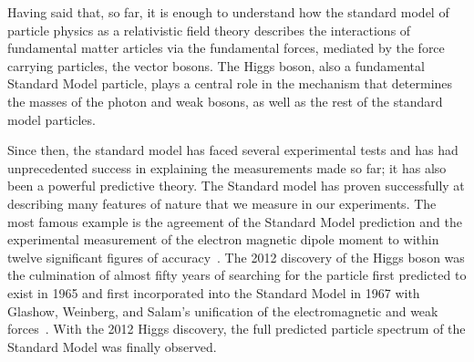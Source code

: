 Having said that, so far, it is enough to understand how the standard model of particle physics as a relativistic field theory describes the interactions of fundamental matter articles via the fundamental forces, mediated by the force carrying particles, the vector bosons. The Higgs boson, also a fundamental Standard Model particle, plays a central role  in the mechanism that determines the masses of the photon and weak bosons, as well as the rest of the standard model particles.

Since then, the standard model has faced several experimental tests and has had unprecedented success in explaining the measurements made so far; it has also been a powerful predictive theory. The Standard model has proven  successfully at describing many features of nature that we measure in our experiments. The most famous example is the agreement of the Standard Model prediction and the experimental measurement of the electron magnetic dipole moment to within twelve  significant figures of accuracy~\parencite{PhysRevLett.97.030801}.  The 2012 discovery of the Higgs boson was the culmination of almost fifty years of searching for the particle first predicted to exist in 1965 and first incorporated into the Standard Model in 1967 with Glashow, Weinberg, and Salam's unification of the electromagnetic and weak forces~\parencite{PhysRevLett.19.1264, gl1961579}. With the 2012 Higgs discovery, the full predicted particle spectrum of the Standard Model was finally observed.

